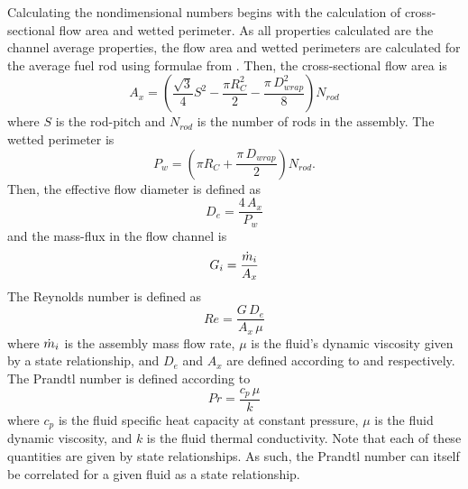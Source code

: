       Calculating the nondimensional numbers begins with the calculation of 
      cross-sectional flow area and wetted perimeter. As all properties 
      calculated are the channel average properties, the flow area and wetted
      perimeters are calculated for the average fuel rod using formulae from 
      \cite{FastSpectrumReactors}. Then, the cross-sectional flow area is
      \begin{equation}
        \label{eq:correlation_ax}
        A_x = \left(\frac{\sqrt{3}}{4} S^2 - \frac{\pi R_C^2}{2} - 
          \frac{\pi \, D_{wrap}^2}{8} \right) N_{rod}
      \end{equation}
      where $S$ is the rod-pitch and $N_{rod}$ is the number of rods in the 
      assembly. The wetted perimeter is
      \begin{equation}
        \label{eq:correlation_pw}
        P_w = \left(\pi R_C + \frac{\pi\,D_{wrap}}{2}\right) N_{rod}.
      \end{equation}
      Then, the effective flow diameter is defined as
      \begin{equation}
        \label{eq:correlation_de}
        D_e = \frac{4 \, A_x}{P_w}
      \end{equation}
      and the mass-flux in the flow channel is 
      \begin{equation}
        \label{eq:correlation_g}
        G_i = \frac{\dot{m}_i}{A_x}
      \end{equation}
      The Reynolds number is defined as
      \begin{equation}
        \label{eq:re}
        Re = \frac{G \, D_e}{A_x \, \mu}
      \end{equation}
      where $\dot{m}_i$ is the assembly mass flow rate, $\mu$ is the fluid's
      dynamic viscosity given by a state relationship, and $D_e$ and $A_x$ are 
      defined according to  and 
      respectively. The Prandtl number is defined according to 
      \begin{equation}
        \label{eq:pr}
        Pr = \frac{c_p \, \mu}{k}
      \end{equation}
      where $c_p$ is the fluid specific heat capacity at constant pressure, 
      $\mu$ is the fluid dynamic viscosity, and $k$ is the fluid thermal 
      conductivity. Note that each of these quantities are given by state 
      relationships. As such, the Prandtl number can itself be correlated for a
      given fluid as a state relationship.
      
